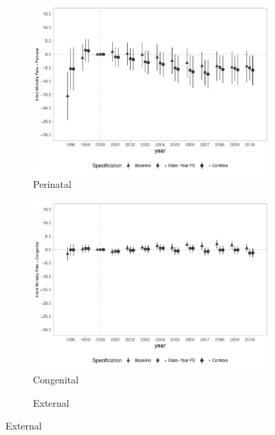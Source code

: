 \begin{figure}[h]
\begin{center}
    \begin{subfigure}{0.32\textwidth}
        \centering
        \caption{\scriptsize Perinatal}\label{fig:imr3_c}
        \includegraphics[width=\textwidth]{plots/IMR/tx_mi_perinat_dist_ec29_baseline_dist_ec29_baseline_full.pdf}
    \end{subfigure}
        \begin{subfigure}{0.32\textwidth}
        \centering
        \caption{\scriptsize Congenital}\label{fig:imr3_d}
        \includegraphics[width=\textwidth]{plots/IMR/tx_mi_cong_dist_ec29_baseline_dist_ec29_baseline_full.pdf}
    \end{subfigure}
        \begin{subfigure}{0.32\textwidth}
        \centering
        \caption{\scriptsize External}\label{fig:imr3_e}

\end{subfigure}
\end{center}
\end{figure}
